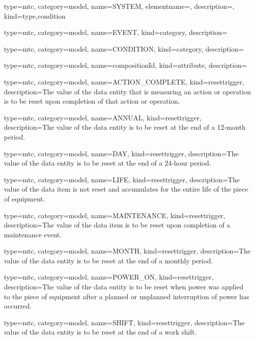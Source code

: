 {
  type=mtc,
  category=model,
  name={SYSTEM},
  elementname=,
  description={},
  kind={type,condition}
}


{
  type=mtc,
  category=model,
  name={EVENT},
  kind={category},
  description={}
}


{
  type=mtc,
  category=model,
  name={CONDITION},
  kind={category},
  description={}
}


{
  type=mtc,
  category=model,
  name={compositionId},
  kind={attribute},
  description={}
}


{
  type=mtc,
  category=model,
  name={ACTION\_COMPLETE},
  kind={resettrigger},
  description={The value of the \gls{data entity} that is measuring an action or operation is to be reset upon completion of that action or operation.}
}


{
  type=mtc,
  category=model,
  name={ANNUAL},
  kind={resettrigger},
  description={The value of the \gls{data entity} is to be reset at the end of a 12-month period.}
}


{
  type=mtc,
  category=model,
  name={DAY},
  kind={resettrigger},
  description={The value of the \gls{data entity} is to be reset at the end of a 24-hour period.}
}


{
  type=mtc,
  category=model,
  name={LIFE},
  kind={resettrigger},
  description={The value of the data item is not reset and accumulates for the entire life of the piece of equipment.}
}


{
  type=mtc,
  category=model,
  name={MAINTENANCE},
  kind={resettrigger},
  description={The value of the data item is to be reset upon completion of a maintenance event.}
}


{
  type=mtc,
  category=model,
  name={MONTH},
  kind={resettrigger},
  description={The value of the \gls{data entity} is to be reset at the end of a monthly period.}
}


{
  type=mtc,
  category=model,
  name={POWER\_ON},
  kind={resettrigger},
  description={The value of the \gls{data entity} is to be reset when power was applied to the piece of equipment after a planned or unplanned interruption of power has occurred.}
}


{
  type=mtc,
  category=model,
  name={SHIFT},
  kind={resettrigger},
  description={The value of the \gls{data entity} is to be reset at the end of a work shift.}
}


